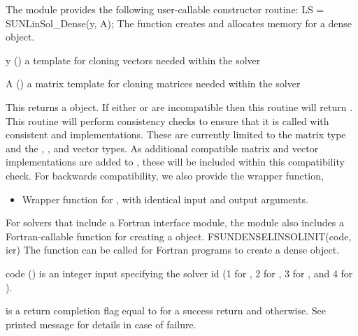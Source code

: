 The module {\sunlinsoldense} provides the following user-callable constructor routine: 
{
  LS = SUNLinSol\_Dense(y, A);
}
{
  The function  creates and allocates memory for
  a dense  object.
}
{
  \begin{args}[y]
  \item[y] ()
    a template for cloning vectors needed within the solver
  \item[A] ()
    a {\sunmatdense} matrix template for cloning matrices needed
    within the solver 
  \end{args}
}
{
  This returns a  object.  If either  or
   are incompatible then this routine will return .
}
{
  This routine will perform consistency checks to ensure that it is
  called with consistent {\nvector} and {\sunmatrix} implementations.
  These are currently limited to the {\sunmatdense} matrix type and
  the {\nvecs}, {\nvecopenmp}, and {\nvecpthreads} vector types.  As
  additional compatible matrix and vector implementations are added to
  {\sundials}, these will be included within this compatibility check.
}
For backwards compatibility, we also provide the wrapper function,
\begin{itemize}

\item {}

  Wrapper function for , with identical input and
  output arguments.

\end{itemize}
For solvers that include a Fortran interface module, the {\sunlinsoldense}
module also includes a Fortran-callable function for creating a
 object.
{
  FSUNDENSELINSOLINIT(code, ier)
}
{
  The function  can be called for Fortran programs
  to create a dense  object.
}
{
  \begin{args}[code]
  \item[code] ()
    is an integer input specifying the solver id (1 for {\cvode}, 2
    for {\ida}, 3 for {\kinsol}, and 4 for {\arkode}).
  \end{args}
}
{
   is a return completion flag equal to  for a success
  return and  otherwise. See printed message for details in case
  of failure.
}

